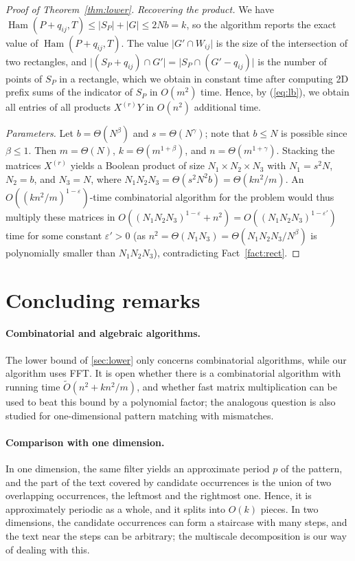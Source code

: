 \documentclass[11pt]{article}
\theoremstyle{definition}
\newcommand{\tO}{\tilde{O}}
\renewcommand{\O}{O}
\DeclareMathOperator{\Ham}{Ham}
\newcommand{\abs}[1]{\lvert #1 \rvert}
\begin{document}
\begin{proof}[Proof of Theorem~\ref{thm:lower}]
\emph{Recovering the product.} We have $\Ham(P + q_{ij}, T) \le \abs{S_P} + \abs{G} \le 2Nb = k$, so the algorithm reports the exact value of $\Ham(P + q_{ij}, T)$.
The value $\abs{G' \cap W_{ij}}$ is the size of the intersection of two rectangles, and $\abs{(S_P + q_{ij}) \cap G'} = \abs{S_P \cap (G' - q_{ij})}$ is the number of points of $S_P$ in a rectangle, which we obtain in constant time after computing 2D prefix sums of the indicator of $S_P$ in $\O(m^2)$ time.
Hence, by (\ref{eq:lb}), we obtain all entries of all products $X^{(r)}Y$ in $\O(n^2)$ additional time.

\emph{Parameters.} Let $b = \Theta(N^\beta)$ and $s = \Theta(N^\gamma)$; note that $b \le N$ is possible since $\beta \le 1$.
Then $m = \Theta(N)$, $k = \Theta(m^{1+\beta})$, and $n = \Theta(m^{1+\gamma})$.
Stacking the matrices $X^{(r)}$ yields a Boolean product of size $N_1 \times N_2 \times N_3$ with $N_1 = s^2N$, $N_2 = b$, and $N_3 = N$, where $N_1N_2N_3 = \Theta(s^2N^2b) = \Theta(kn^2/m)$.
An $\O((kn^2/m)^{1-\varepsilon})$-time combinatorial algorithm for the problem would thus multiply these matrices in $\O((N_1N_2N_3)^{1-\varepsilon} + n^2) = \O((N_1N_2N_3)^{1-\varepsilon'})$ time for some constant $\varepsilon' > 0$ (as $n^2 = \Theta(N_1N_3) = \Theta(N_1N_2N_3/N^\beta)$ is polynomially smaller than $N_1N_2N_3$), contradicting Fact~\ref{fact:rect}.
\end{proof}


\section{Concluding remarks}
\label{sec:remarks}

\paragraph{Combinatorial and algebraic algorithms.}
The lower bound of \autoref{sec:lower} only concerns combinatorial algorithms, while our algorithm uses FFT.
It is open whether there is a combinatorial algorithm with running time $\tO(n^2 + kn^2/m)$, and whether fast matrix multiplication can be used to beat this bound by a polynomial factor; the analogous question is also studied for one-dimensional pattern matching with mismatches.

\paragraph{Comparison with one dimension.}
In one dimension, the same filter yields an approximate period $p$ of the pattern, and the part of the text covered by candidate occurrences is the union of two overlapping occurrences, the leftmost and the rightmost one.
Hence, it is approximately periodic as a whole, and it splits into $\O(k)$ pieces.
In two dimensions, the candidate occurrences can form a staircase with many steps, and the text near the steps can be arbitrary; the multiscale decomposition is our way of dealing with this.
\end{document}
